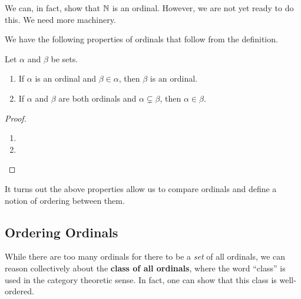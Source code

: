 We can, in fact, show that $\mathbb{N}$ is an ordinal. However, we are not yet ready to do this. We need more machinery.

We have the following properties of ordinals that follow from the definition.

\begin{boxproposition}
    Let $\alpha$ and $\beta$ be sets.
    \begin{enumerate}
        \item If $\alpha$ is an ordinal and $\beta \in \alpha$, then $\beta$ is an ordinal.
        \item If $\alpha$ and $\beta$ are both ordinals and $\alpha \subsetneq \beta$, then $\alpha \in \beta$.
    \end{enumerate}
\end{boxproposition}
\begin{proof}\hfill
    \begin{enumerate}
        \item \sorry

        \item \sorry
    \end{enumerate}
\end{proof}

It turns out the above properties allow us to compare ordinals and define a notion of ordering between them.

\subsection{Ordering Ordinals}

While there are too many ordinals for there to be a \textit{set} of all ordinals, we can reason collectively about the \textbf{class of all ordinals}, where the word ``class'' is used in the category theoretic sense.  In fact, one can show that this class is well-ordered.

